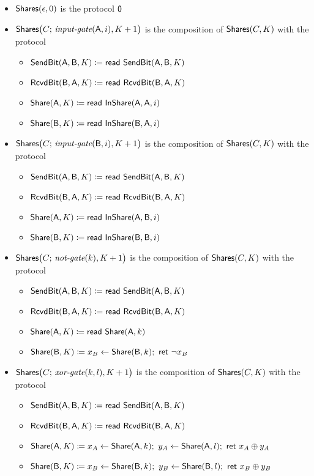 \begin{itemize}
\item $\Shares(\epsilon,0)$ is the protocol $\zero$

\item $\Shares\big(C; \, \inputgate(\A,i),K+1\big)$ is the composition of $\Shares(C,K)$ with the protocol
\begin{itemize}
\item $\SendBit(\A,\B,K) \coloneqq \read{\SendBit(\A,\B,K)}$
\item $\RcvdBit(\B,\A,K) \coloneqq \read{\RcvdBit(\B,\A,K)}$
\item $\Share(\A,K) \coloneqq \read{\InShare(\A,\A,i)}$
\item $\Share(\B,K) \coloneqq \read{\InShare(\B,\A,i)}$
\end{itemize}

\item $\Shares\big(C; \, \inputgate(\B,i),K+1\big)$ is the composition of $\Shares(C,K)$ with the protocol
\begin{itemize}
\item $\SendBit(\A,\B,K) \coloneqq \read{\SendBit(\A,\B,K)}$
\item $\RcvdBit(\B,\A,K) \coloneqq \read{\RcvdBit(\B,\A,K)}$
\item $\Share(\A,K) \coloneqq \read{\InShare(\A,\B,i)}$
\item $\Share(\B,K) \coloneqq \read{\InShare(\B,\B,i)}$
\end{itemize}

\item $\Shares\big(C; \, \notgate(k),K+1\big)$ is the composition of $\Shares(C,K)$ with the protocol
\begin{itemize}
\item $\SendBit(\A,\B,K) \coloneqq \read{\SendBit(\A,\B,K)}$
\item $\RcvdBit(\B,\A,K) \coloneqq \read{\RcvdBit(\B,\A,K)}$
\item $\Share(\A,K) \coloneqq \read{\Share(\A,k)}$
\item $\Share(\B,K) \coloneqq x_B \leftarrow \Share(\B,k); \ \ret{\neg x_B}$
\end{itemize}

\item $\Shares\big(C; \, \xorgate(k,l),K+1\big)$ is the composition of $\Shares(C,K)$ with the protocol
\begin{itemize}
\item $\SendBit(\A,\B,K) \coloneqq \read{\SendBit(\A,\B,K)}$
\item $\RcvdBit(\B,\A,K) \coloneqq \read{\RcvdBit(\B,\A,K)}$
\item $\Share(\A,K) \coloneqq x_A \leftarrow \Share(\A,k); \ y_A \leftarrow \Share(\A,l); \ \ret{x_A \oplus y_A}$
\item $\Share(\B,K) \coloneqq x_B \leftarrow \Share(\B,k); \ y_B \leftarrow \Share(\B,l); \ \ret{x_B \oplus y_B}$
\end{itemize}


\end{itemize}
